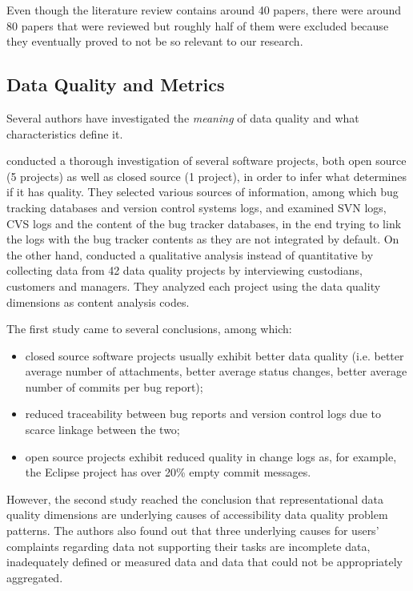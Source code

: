 \documentclass{mprop}
\begin{document}
Even though the literature review contains around 40 papers, there were
around 80 papers that were reviewed but roughly half of them were excluded 
because they eventually proved to not be so relevant to our research. 

\subsection{Data Quality and Metrics}

Several authors have investigated the \emph{meaning} of data quality and
what characteristics define it.

\citet{bachmann2009software} conducted a thorough investigation of several
software projects, both open source (5 projects) as well as closed source (1 
project), in order to infer what determines if it has quality. They selected 
various sources of information, among which bug tracking 
databases and version control systems logs, and examined SVN logs, CVS logs
and the content of the bug tracker databases, in the end trying to link 
the logs with the bug tracker contents as they are not integrated by default. 
On the other hand, \citet{strong1997data} conducted a qualitative analysis
instead of quantitative by collecting data from 42 data quality projects by 
interviewing custodians, customers and managers. They analyzed each project
using the data quality dimensions as content analysis codes.

The first study came to several conclusions, among which:
  \begin{itemize}
    \item closed source software projects usually exhibit better data quality 
    (i.e. better average number of attachments, better average status changes, 
    better average number of commits per bug report);
    \item reduced traceability between bug reports and version control logs
    due to scarce linkage between the two;
    \item open source projects exhibit reduced quality in change logs as,
    for example, the Eclipse project has over 20\% empty commit messages.
  \end{itemize}

However, the second study reached the conclusion that representational data 
quality dimensions are underlying causes of accessibility data quality problem
patterns. The authors also found out that three underlying causes for users'
complaints regarding data not supporting their tasks are incomplete data, 
inadequately defined or measured data and data that could not be appropriately
aggregated.
\end{document}

